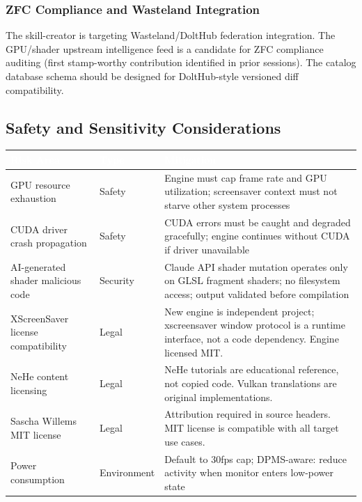 \documentclass[11pt,letterpaper]{article}
\newcommand{\tableheader}[1]{\textbf{\sffamily\textcolor{white}{#1}}}
\begin{document}
\subsubsection{ZFC Compliance and Wasteland Integration}

The skill-creator is targeting Wasteland/DoltHub federation integration. The GPU/shader upstream intelligence feed is a candidate for ZFC compliance auditing (first stamp-worthy contribution identified in prior sessions). The catalog database schema should be designed for DoltHub-style versioned diff compatibility.

\subsection{Safety and Sensitivity Considerations}

\begin{center}
\begin{tabularx}{\textwidth}{L{3.5cm}L{2cm}X}
\toprule
{}
\tableheader{Risk Area} & \tableheader{Type} & \tableheader{Mitigation} \\
\midrule
GPU resource exhaustion & Safety & Engine must cap frame rate and GPU utilization; screensaver context must not starve other system processes \\
CUDA driver crash propagation & Safety & CUDA errors must be caught and degraded gracefully; engine continues without CUDA if driver unavailable \\
AI-generated shader malicious code & Security & Claude API shader mutation operates only on GLSL fragment shaders; no filesystem access; output validated before compilation \\
XScreenSaver license compatibility & Legal & New engine is independent project; xscreensaver window protocol is a runtime interface, not a code dependency. Engine licensed MIT. \\
NeHe content licensing & Legal & NeHe tutorials are educational reference, not copied code. Vulkan translations are original implementations. \\
Sascha Willems MIT license & Legal & Attribution required in source headers. MIT license is compatible with all target use cases. \\
Power consumption & Environment & Default to 30fps cap; DPMS-aware: reduce activity when monitor enters low-power state \\
\bottomrule
\end{tabularx}
\end{center}
\end{document}
